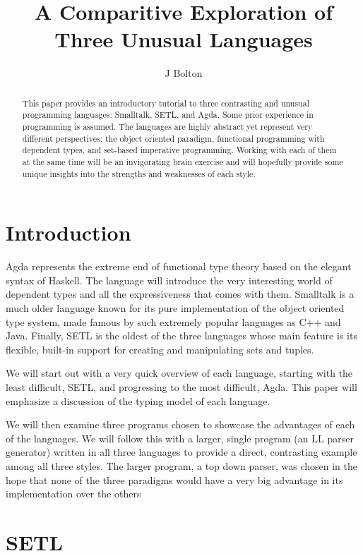 \documentclass[11pt]{article}
\author{J Bolton}
\title{A Comparitive Exploration of Three Unusual Languages}
\begin{document}
\maketitle

\tableofcontents

\begin{abstract}
    This paper provides an introductory tutorial to three contrasting and
    unusual programming languages: Smalltalk, SETL, and Agda. Some prior
    experience in programming is assumed. The languages are highly abstract yet
    represent very different perspectives: the object oriented paradigm,
    functional programming with dependent types, and set-based imperative
    programming. Working with each of them at the same time will be an
    invigorating brain exercise and will hopefully provide some unique insights
    into the strengths and weaknesses of each style.
\end{abstract}

\section{Introduction}
    Agda represents the extreme end of functional type theory based on the
    elegant syntax of Haskell. The language will introduce the very
    interesting world of dependent types and all the expressiveness that comes
    with them. Smalltalk is a much older language known for its pure
    implementation of the object oriented type system, made famous by such
    extremely popular languages as C++ and Java. Finally, SETL is the oldest of 
    the three languages whose main feature is its flexible, built-in support 
    for creating and manipulating sets and tuples.

    We will start out with a very quick overview of each language,
    starting with the least difficult, SETL, and progressing to the most
    difficult, Agda. This paper will emphasize a discussion of the typing
    model of each language.

    We will then examine three programs chosen to showcase the advantages of
    each of the languages. We will follow this with a larger, single program
    (an LL parser generator) written in all three languages to provide a
    direct, contrasting example among all three styles.  The larger program, a
    top down parser, was chosen in the hope that none of the three paradigms
    would have a very big advantage in its implementation over the others 

\section{SETL}
\end{document}
